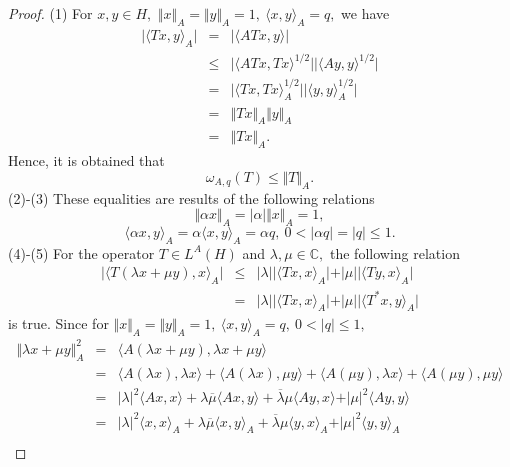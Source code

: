 \documentclass[preprint,12pt,3p]{elsarticle}
\begin{document}
\begin{proof}
(1) For $ x, y \in H, $ $ \Vert x \Vert_{A}=\Vert y \Vert_{A}=1, \ \langle x,y \rangle_{A}=q, $ we have 
\begin{eqnarray}
\vert \langle Tx,y \rangle_{A}\vert & = & \vert \langle ATx,y \rangle \vert \nonumber \\
& \leq & \vert \langle ATx,Tx \rangle^{1/2} \vert \vert \langle Ay,y \rangle^{1/2} \vert \nonumber \\
& = & \vert \langle Tx,Tx \rangle_{A}^{1/2} \vert \vert \langle y,y \rangle_{A}^{1/2} \vert \nonumber \\
& = & \Vert Tx \Vert_{A} \Vert y \Vert_{A} \nonumber \\
& = & \Vert Tx \Vert_{A}.  \nonumber
\end{eqnarray}
Hence, it is obtained that
$$
\omega_{A,q}(T)\leq \Vert T \Vert_{A}.
$$
(2)-(3) These equalities are results of the following relations 
$$
\Vert \alpha x \Vert_{A}=\vert \alpha \vert \Vert  x \Vert_{A}=1,
$$
$$
\langle \alpha x,y \rangle_{A}=\alpha \langle x,y \rangle_{A}=\alpha q, \ 0<\vert \alpha q \vert= \vert q \vert \leq 1.
$$
(4)-(5) For the operator $ T\in L^{A}(H) $ and $ \lambda,\mu\in \mathbb{C},$ the following relation
\begin{eqnarray}
\vert \langle T(\lambda x+\mu y),x\rangle_{A} \vert &\leq & \vert \lambda\vert \vert \langle Tx,x\rangle_{A} \vert +  \vert \mu\vert \vert \langle Ty,x\rangle_{A} \vert  \nonumber \\
& = & \vert \lambda\vert \vert \langle Tx,x\rangle_{A} \vert +  \vert \mu\vert \vert \langle T^{*}x,y\rangle_{A} \vert \nonumber
\end{eqnarray}
is true. Since for $ \Vert x \Vert_{A}=\Vert y \Vert_{A}=1, \ \langle x,y\rangle_{A}=q, \ 0<\vert q \vert\leq 1, $ 
\begin{eqnarray}
\Vert \lambda x+\mu y \Vert_{A}^{2} & = & \langle A(\lambda x+\mu y), \lambda x+\mu y \rangle \nonumber \\
& = & \langle A(\lambda x), \lambda x \rangle +\langle A(\lambda x), \mu y \rangle +\langle A(\mu y), \lambda x\rangle + \langle A(\mu y), \mu y \rangle \nonumber \\
& = & \vert \lambda \vert^{2} \langle Ax,  x \rangle + \lambda \overline{\mu} \langle Ax,y \rangle + \overline{\lambda}\mu \langle Ay, x \rangle +\vert \mu \vert^{2} \langle Ay, y \rangle \nonumber \\
& = & \vert \lambda \vert^{2} \langle x,  x \rangle_{A} + \lambda \overline{\mu} \langle x,y \rangle_{A} + \overline{\lambda}\mu \langle y, x \rangle_{A} +\vert \mu \vert^{2} \langle y, y \rangle_{A} \nonumber \\

\end{eqnarray}
\end{proof}
\end{document}
